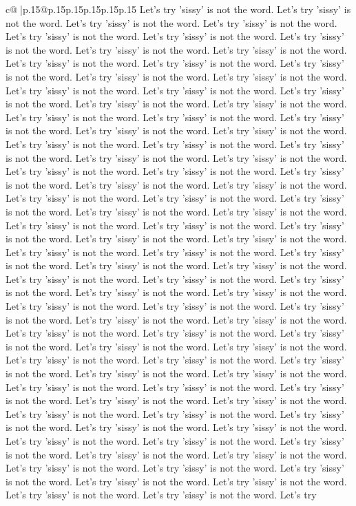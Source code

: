 \documentclass{article}
\begin{document}
{\begin{supertabular}{c@{$\;$}|p{.15\linewidth}@{}p{.15\linewidth}p{.15\linewidth}p{.15\linewidth}p{.15\linewidth}p{.15\linewidth}}
{{{Let's try 'sissy' is not the word. Let's try 'sissy' is not the word. Let's try 'sissy' is not the word. Let's try 'sissy' is not the word. Let's try 'sissy' is not the word. Let's try 'sissy' is not the word. Let's try 'sissy' is not the word. Let's try 'sissy' is not the word. Let's try 'sissy' is not the word. Let's try 'sissy' is not the word. Let's try 'sissy' is not the word. Let's try 'sissy' is not the word. Let's try 'sissy' is not the word. Let's try 'sissy' is not the word. Let's try 'sissy' is not the word. Let's try 'sissy' is not the word. Let's try 'sissy' is not the word. Let's try 'sissy' is not the word. Let's try 'sissy' is not the word. Let's try 'sissy' is not the word. Let's try 'sissy' is not the word. Let's try 'sissy' is not the word. Let's try 'sissy' is not the word. Let's try 'sissy' is not the word. Let's try 'sissy' is not the word. Let's try 'sissy' is not the word. Let's try 'sissy' is not the word. Let's try 'sissy' is not the word. Let's try 'sissy' is not the word. Let's try 'sissy' is not the word. Let's try 'sissy' is not the word. Let's try 'sissy' is not the word. Let's try 'sissy' is not the word. Let's try 'sissy' is not the word. Let's try 'sissy' is not the word. Let's try 'sissy' is not the word. Let's try 'sissy' is not the word. Let's try 'sissy' is not the word. Let's try 'sissy' is not the word. Let's try 'sissy' is not the word. Let's try 'sissy' is not the word. Let's try 'sissy' is not the word. Let's try 'sissy' is not the word. Let's try 'sissy' is not the word. Let's try 'sissy' is not the word. Let's try 'sissy' is not the word. Let's try 'sissy' is not the word. Let's try 'sissy' is not the word. Let's try 'sissy' is not the word. Let's try 'sissy' is not the word. Let's try 'sissy' is not the word. Let's try 'sissy' is not the word. Let's try 'sissy' is not the word. Let's try 'sissy' is not the word. Let's try 'sissy' is not the word. Let's try 'sissy' is not the word. Let's try 'sissy' is not the word. Let's try 'sissy' is not the word. Let's try 'sissy' is not the word. Let's try 'sissy' is not the word. Let's try 'sissy' is not the word. Let's try 'sissy' is not the word. Let's try 'sissy' is not the word. Let's try 'sissy' is not the word. Let's try 'sissy' is not the word. Let's try 'sissy' is not the word. Let's try 'sissy' is not the word. Let's try 'sissy' is not the word. Let's try 'sissy' is not the word. Let's try 'sissy' is not the word. Let's try 'sissy' is not the word. Let's try 'sissy' is not the word. Let's try 'sissy' is not the word. Let's try 'sissy' is not the word. Let's try 'sissy' is not the word. Let's try 'sissy' is not the word. Let's try 'sissy' is not the word. Let's try 'sissy' is not the word. Let's try 'sissy' is not the word. Let's try 'sissy' is not the word. Let's try 'sissy' is not the word. Let's try 'sissy' is not the word. Let's try 'sissy' is not the word. Let's try 'sissy' is not the word. Let's try 'sissy' is not the word. Let's try 'sissy' is not the word. Let's try 'sissy' is not the word. Let's try 'sissy' is not the word. Let's try 'sissy' is not the word. Let's try 'sissy' is not the word. Let's try 'sissy' is not the word. Let's try }}}
\end{supertabular}}
\end{document}
